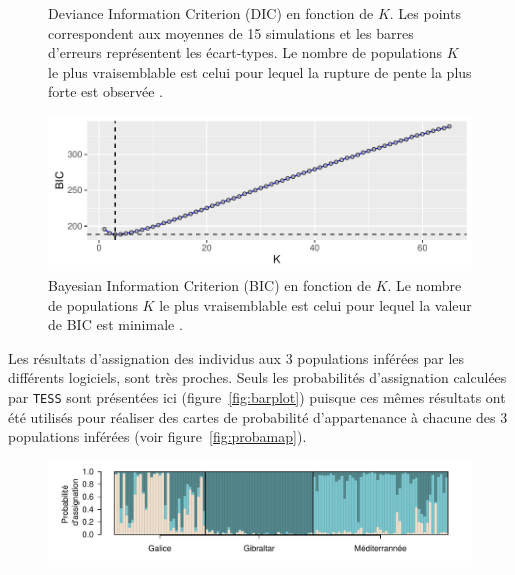 \documentclass[a4paper,12pt,twoside]{article}\usepackage[]{graphicx}\usepackage[]{color}
\makeatletter
\def\maxwidth{ %
  \ifdim\Gin@nat@width>\linewidth
    \linewidth
  \else
    \Gin@nat@width
  \fi
}
\makeatother
\begin{document}
\begin {bibunit} [newbst]
\begin{figure}[htpb]
{}

\caption[Deviance Information Criterion (DIC) en fonction de $K$.]{Deviance Information Criterion (DIC) en fonction de $K$. Les points correspondent aux moyennes de 15 simulations et les barres d'erreurs représentent les écart-types. Le nombre de populations $K$ le plus vraisemblable est celui pour lequel la rupture de pente la plus forte est observée \citep{durand2009}.}\label{fig:dic}
\end{figure}




\begin{figure}[htpb]

{\centering \includegraphics[width=\maxwidth]{figure/bic-1} 

}

\caption[Bayesian Information Criterion (BIC) en fonction de $K$.]{Bayesian Information Criterion (BIC) en fonction de $K$. Le nombre de populations $K$ le plus vraisemblable est celui pour lequel la valeur de BIC est minimale \citep{jombart2008}.}\label{fig:bic}
\end{figure}



Les résultats d'assignation des individus aux 3 populations inférées par les différents logiciels, sont très proches. Seuls les probabilités d'assignation calculées par \texttt{TESS} sont présentées ici (figure~\ref{fig:barplot}) puisque ces mêmes résultats ont été utilisés pour réaliser des cartes de probabilité d'appartenance à chacune des 3 populations inférées (voir figure~\ref{fig:probamap}).

\begin{figure}[htpb]

{\centering \includegraphics[width=\maxwidth]{figure/barplot-1} 

}
\end{figure}
\end{bibunit}
\end{document}
